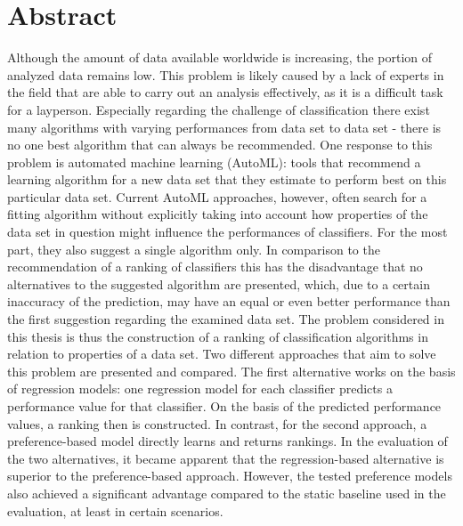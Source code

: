 %
\chapter*{Abstract}
\label{sec:abstract}
\vspace*{-10mm}

Although the amount of data available worldwide is increasing, the portion of analyzed data remains low. This problem is likely caused by a lack of experts in the field that are able to carry out an analysis effectively, as it is a difficult task for a layperson. Especially regarding the challenge of classification there exist many algorithms with varying performances from data set to data set - there is no one best algorithm that can always be recommended. One response to this problem is automated machine learning (AutoML): tools that recommend a learning algorithm for a new data set that they estimate to perform best on this particular data set. Current AutoML approaches, however, often search for a fitting algorithm without explicitly taking into account how properties of the data set in question might influence the performances of classifiers. For the most part, they also suggest a single algorithm only. In comparison to the recommendation of a ranking of classifiers this has the disadvantage that no alternatives to the suggested algorithm are presented, which, due to a certain inaccuracy of the prediction, may have an equal or even better performance than the first suggestion regarding the examined data set. The problem considered in this thesis is thus the construction of a ranking of classification algorithms in relation to properties of a data set. Two different approaches that aim to solve this problem are presented and compared. The first alternative works on the basis of regression models: one regression model for each classifier predicts a performance value for that classifier. On the basis of the predicted performance values, a ranking then is constructed. In contrast, for the second approach, a preference-based model directly learns and returns rankings. In the evaluation of the two alternatives, it became apparent that the regression-based alternative is superior to the preference-based approach. However, the tested preference models also achieved a significant advantage compared to the static baseline used in the evaluation, at least in certain scenarios. 

\vspace*{20mm}
\newpage

